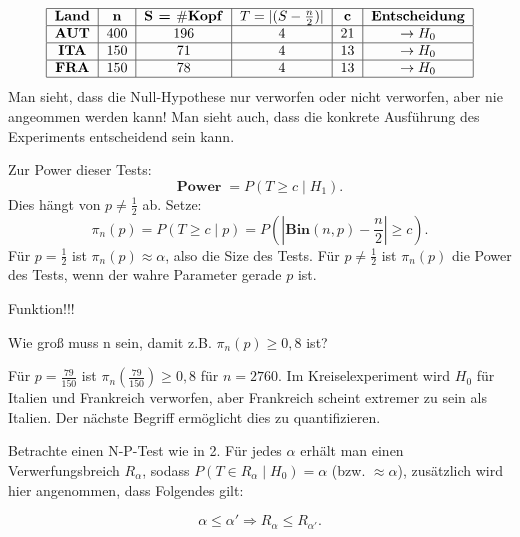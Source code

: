 \documentclass[10pt]{article}
\newcommand{\eqname}[1]{\tag*{#1}}%
\newenvironment{BSP}[1][]
{\begin{Beispiel}[frametitle=#1]}{\end{Beispiel}}
\begin{document}
\begin{BSP}[Beispiel 2.0.1 (Ist der Euro fair?)]
			\begin{align*}
			\begin{tabular}{|c|c|c|c|c|c|c|}
				\hline
				\textbf{Land} & \textbf{n} & \textbf{S = $\#$Kopf} & \textbf{$T = \vert(S - \frac{n}{2})\vert$} & \textbf{c} & \textbf{Entscheidung}\\
				\hline
				\textbf{AUT} & 400 & 196 & 4 & 21 & $\rightarrow H_0$\\
				\hline
				\textbf{ITA} & 150 & 71 & 4 & 13 &$\rightarrow H_0$\\
				\hline
				\textbf{FRA} & 150 & 78 & 4 & 13 &$\rightarrow H_0$\\
				\hline
			\end{tabular}
		\end{align*}
		Man sieht, dass die Null-Hypothese nur verworfen oder nicht verworfen, aber nie angeommen werden kann! Man sieht auch, dass die konkrete Ausführung des Experiments entscheidend sein kann. 
		
		Zur Power dieser Tests:
		\begin{equation*}
			\textbf{Power} \; = P(T \geq c \mid H_1).
		\end{equation*}
		Dies hängt von $p \neq \frac{1}{2}$ ab.
		Setze:
		\begin{equation*}
			\pi_n(p) = P(T \geq c \mid p) = P\left(\left\vert \textbf{Bin}(n,p) - \frac{n}{2} \right\vert \geq c \right).
		\end{equation*}
		Für $p = \frac{1}{2}$ ist $\pi_n (p) \approx \alpha$, also die Size des Tests. Für $p \neq \frac{1}{2}$ ist $\pi_n(p)$ die Power des Tests, wenn der wahre Parameter gerade $p$ ist.
		
		Funktion!!!
		
		Wie groß muss n sein, damit z.B. $\pi_n (p) \geq 0,8$ ist? 
		
		Für $p = \frac{79}{150}$ ist $\pi_n \left(\frac{79}{150}\right) \geq 0,8$ für $n = 2760$. Im Kreiselexperiment wird $H_0$ für Italien und Frankreich verworfen, aber Frankreich scheint extremer zu sein als Italien. Der nächste Begriff ermöglicht dies zu quantifizieren.
	\end{BSP}
	
	Betrachte einen N-P-Test wie in 2. Für jedes $\alpha$ erhält man einen Verwerfungsbreich $R_\alpha$, sodass $P(T \in R_\alpha \mid H_0) = \alpha$ (bzw. $\approx \alpha$), zusätzlich wird hier angenommen, dass Folgendes gilt:
	
	\begin{equation*}
		\alpha \leq \alpha' \Rightarrow R_\alpha \leq R_{\alpha'}. \eqname{(1)}
	\end{equation*}
	
\end{document}
